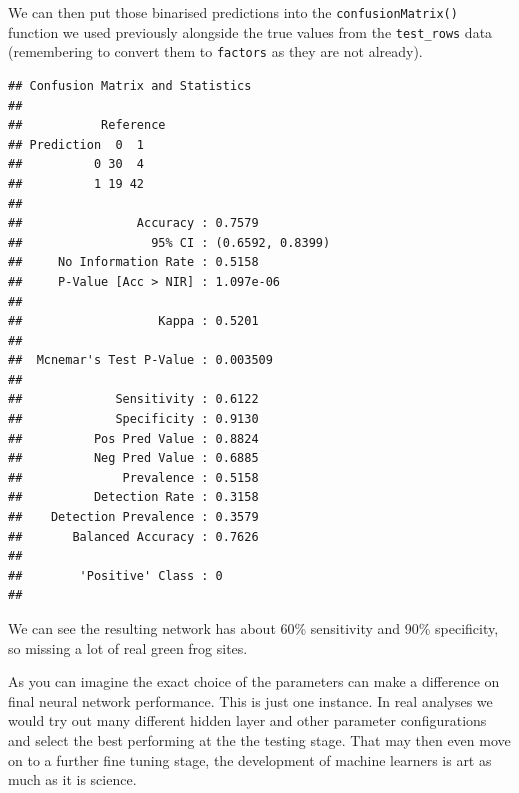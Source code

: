 \documentclass[
]{book}
\newenvironment{Shaded}{\begin{snugshade}}{\end{snugshade}}
\newcommand{\DataTypeTok}[1]{\textcolor[rgb]{0.13,0.29,0.53}{#1}}
\newcommand{\DecValTok}[1]{\textcolor[rgb]{0.00,0.00,0.81}{#1}}
\newcommand{\KeywordTok}[1]{\textcolor[rgb]{0.13,0.29,0.53}{\textbf{#1}}}
\newcommand{\NormalTok}[1]{#1}
\newcommand{\OperatorTok}[1]{\textcolor[rgb]{0.81,0.36,0.00}{\textbf{#1}}}
\newcommand{\StringTok}[1]{\textcolor[rgb]{0.31,0.60,0.02}{#1}}
\begin{document}
\begin{Shaded}
\end{Shaded}

We can then put those binarised predictions into the \texttt{confusionMatrix()} function we used previously alongside the true values from the \texttt{test\_rows} data (remembering to convert them to \texttt{factors} as they are not already).

\begin{Shaded}
\end{Shaded}

\begin{verbatim}
## Confusion Matrix and Statistics
## 
##           Reference
## Prediction  0  1
##          0 30  4
##          1 19 42
##                                           
##                Accuracy : 0.7579          
##                  95% CI : (0.6592, 0.8399)
##     No Information Rate : 0.5158          
##     P-Value [Acc > NIR] : 1.097e-06       
##                                           
##                   Kappa : 0.5201          
##                                           
##  Mcnemar's Test P-Value : 0.003509        
##                                           
##             Sensitivity : 0.6122          
##             Specificity : 0.9130          
##          Pos Pred Value : 0.8824          
##          Neg Pred Value : 0.6885          
##              Prevalence : 0.5158          
##          Detection Rate : 0.3158          
##    Detection Prevalence : 0.3579          
##       Balanced Accuracy : 0.7626          
##                                           
##        'Positive' Class : 0               
## 
\end{verbatim}

We can see the resulting network has about 60\% sensitivity and 90\% specificity, so missing a lot of real green frog sites.

As you can imagine the exact choice of the parameters can make a difference on final neural network performance. This is just one instance. In real analyses we would try out many different hidden layer and other parameter configurations and select the best performing at the the testing stage. That may then even move on to a further fine tuning stage, the development of machine learners is art as much as it is science.
\end{document}
